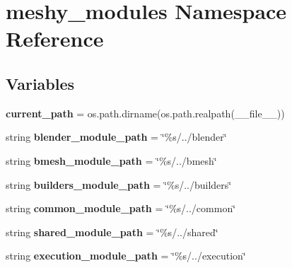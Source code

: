 \hypertarget{namespacemeshy__modules}{}\section{meshy\+\_\+modules Namespace Reference}
\label{namespacemeshy__modules}
\subsection*{Variables}
\begin{DoxyCompactItemize}
\item 
{\bfseries current\+\_\+path} = os.\+path.\+dirname(os.\+path.\+realpath(\+\_\+\+\_\+file\+\_\+\+\_\+))\hypertarget{namespacemeshy__modules_a58ee772fa56659704a89ff90606caad1}{}\label{namespacemeshy__modules_a58ee772fa56659704a89ff90606caad1}

\item 
string {\bfseries blender\+\_\+module\+\_\+path} = \char`\"{}\%s/../blender\char`\"{}\hypertarget{namespacemeshy__modules_ae50b3dcc12326b5155e78f168c640b37}{}\label{namespacemeshy__modules_ae50b3dcc12326b5155e78f168c640b37}

\item 
string {\bfseries bmesh\+\_\+module\+\_\+path} = \char`\"{}\%s/../bmesh\char`\"{}\hypertarget{namespacemeshy__modules_a89d43ab2e7e1e493106fc6e7d3875044}{}\label{namespacemeshy__modules_a89d43ab2e7e1e493106fc6e7d3875044}

\item 
string {\bfseries builders\+\_\+module\+\_\+path} = \char`\"{}\%s/../builders\char`\"{}\hypertarget{namespacemeshy__modules_a9d5ca38890bdf498e99ccb66844baf24}{}\label{namespacemeshy__modules_a9d5ca38890bdf498e99ccb66844baf24}

\item 
string {\bfseries common\+\_\+module\+\_\+path} = \char`\"{}\%s/../common\char`\"{}\hypertarget{namespacemeshy__modules_ad4ae4005d9257d94fa9f16be9cc19950}{}\label{namespacemeshy__modules_ad4ae4005d9257d94fa9f16be9cc19950}

\item 
string {\bfseries shared\+\_\+module\+\_\+path} = \char`\"{}\%s/../shared\char`\"{}\hypertarget{namespacemeshy__modules_aec682175673c0e3fb6ea5d25d473ffab}{}\label{namespacemeshy__modules_aec682175673c0e3fb6ea5d25d473ffab}

\item 
string {\bfseries execution\+\_\+module\+\_\+path} = \char`\"{}\%s/../execution\char`\"{}\hypertarget{namespacemeshy__modules_ad19dfd976f40422ff2b13a6446cc0591}{}\label{namespacemeshy__modules_ad19dfd976f40422ff2b13a6446cc0591}


\end{DoxyCompactItemize}
